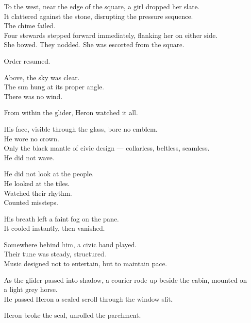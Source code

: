\documentclass[12pt]{article}
\begin{document}
\vspace{1em}

To the west, near the edge of the square, a girl dropped her slate.\\
It clattered against the stone, disrupting the pressure sequence.\\
The chime failed.\\
Four stewards stepped forward immediately, flanking her on either side.\\
She bowed. They nodded. She was escorted from the square.

Order resumed.

\vspace{1em}

Above, the sky was clear.\\
The sun hung at its proper angle.\\
There was no wind.

\vspace{1em}

From within the glider, Heron watched it all.

His face, visible through the glass, bore no emblem.\\
He wore no crown.\\
Only the black mantle of civic design — collarless, beltless, seamless.\\
He did not wave.

He did not look at the people.\\
He looked at the tiles.\\
Watched their rhythm.\\
Counted missteps.

His breath left a faint fog on the pane.\\
It cooled instantly, then vanished.

\vspace{1em}

Somewhere behind him, a civic band played.\\
Their tune was steady, structured.\\
Music designed not to entertain, but to maintain pace.

\vspace{1em}

As the glider passed into shadow, a courier rode up beside the cabin, mounted on a light grey horse.\\
He passed Heron a sealed scroll through the window slit.

Heron broke the seal, unrolled the parchment.
\end{document}
